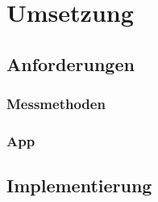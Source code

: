 \newpage
\section{Umsetzung}

\subsection{Anforderungen}

\subsubsection{Messmethoden}

\subsubsection{App}

\subsection{Implementierung}